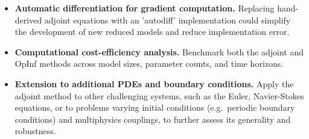 \begin{itemize}
  \item \textbf{Automatic differentiation for gradient computation.}  
    Replacing hand-derived adjoint equations with an 'autodiff' implementation could simplify the development of new reduced models and reduce implementation error.

  \item \textbf{Computational cost-efficiency analysis.} Benchmark both the adjoint and OpInf methods across model sizes, parameter counts, and time horizons. 

  \item \textbf{Extension to additional PDEs and boundary conditions.}  
    Apply the adjoint method to other challenging systems, such as the Euler, Navier-Stokes equations, or to problems varying initial conditions (e.g.\ periodic boundary conditions) and multiphysics couplings, to further assess its generality and robustness.
\end{itemize}
  

